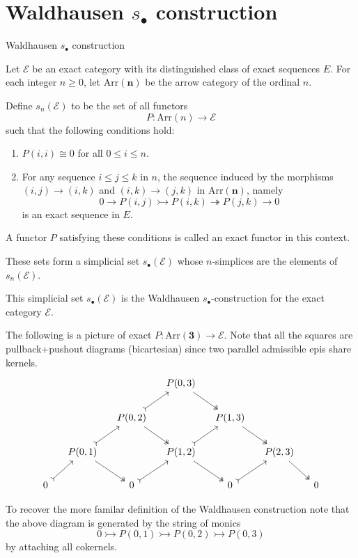 \documentclass[10pt]{beamer}
\begin{document}
\section{Waldhausen \( s_\bullet \) construction}
\begin{frame}{Waldhausen \( s_\bullet \) construction}
	\begin{definition}
		Let $\mathcal{E}$ be an exact category with its distinguished class of exact sequences $E$. For each integer $n \geq 0$, let $\mathrm{Arr}(\mathbf{n})$ be the arrow category of the ordinal $n$.
	\end{definition}
		Define $s_n(\mathcal{E})$ to be the set of all functors
		\[ P: \mathrm{Arr}(n) \to \mathcal{E} \]
		such that the following conditions hold:
		\begin{enumerate}
			\item $P(i, i) \cong 0$ for all $0 \leq i \leq n$.
			\item For any sequence $i \leq j \leq k$ in $n$, the sequence induced by the morphisms $(i,j) \to (i,k)$ and $(i,k) \to (j,k)$ in $\mathrm{Arr}(\mathbf{n})$, namely
			\[ 0 \to P(i, j) \rightarrowtail P(i, k) \twoheadrightarrow P(j, k) \to 0 \]
			is an exact sequence in $E$.
		\end{enumerate}
		A functor $P$ satisfying these conditions is called an exact functor in this context.
		
		These sets form a simplicial set $s_\bullet(\mathcal{E})$ whose $n$-simplices are the elements of $s_n(\mathcal{E})$.

	
	This simplicial set $s_\bullet(\mathcal{E})$ is the Waldhausen \( s_\bullet \)-construction for the exact category $\mathcal{E}$.
	
	\begin{example}
		The following is a picture of exact \( P:\mathrm{Arr}(\mathbf{3}) \to \mathcal{E} \). Note that all the squares are pullback+pushout diagrams (bicartesian) since two parallel admissible epis share kernels.
		\[\begin{tikzcd}[column sep=small]
			&&& {P(0,3)} \\
			&& {P(0,2)} && {P(1,3)} \\
			& {P(0,1)} && {P(1,2)} && {P(2,3)} \\
			0 && 0 && 0 && 0
			\arrow[two heads, from=1-4, to=2-5]
			\arrow[tail, from=2-3, to=1-4]
			\arrow[two heads, from=2-3, to=3-4]
			\arrow[two heads, from=2-5, to=3-6]
			\arrow[tail, from=3-2, to=2-3]
			\arrow[two heads, from=3-2, to=4-3]
			\arrow[tail, from=3-4, to=2-5]
			\arrow[two heads, from=3-4, to=4-5]
			\arrow[two heads, from=3-6, to=4-7]
			\arrow[tail, from=4-1, to=3-2]
			\arrow[tail, from=4-3, to=3-4]
			\arrow[tail, from=4-5, to=3-6]
		\end{tikzcd}\]
	\end{example}
	To recover the more familar definition of the Waldhausen construction note that the above diagram is generated by the string of monics \[0\rightarrowtail P(0,1)\rightarrowtail P(0,2) \rightarrowtail P(0,3) \] by attaching all cokernels.
	
\end{frame}
\end{document}

